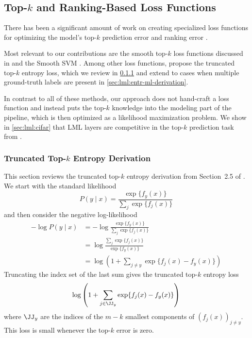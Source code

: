 \subsection{Top-$k$ and Ranking-Based Loss Functions}
\label{sec:lml:rw:topk}
There has been a significant amount of work on creating
specialized loss functions for optimizing the model's
top-$k$ prediction error
\cite{gupta2014training,li2014top,liu2015transductive,
  lapin2015top,liu2015transductive,lapin2016loss,berrada2018smooth}
and ranking error
\cite{agarwal2011infinite,rudin2009p,boyd2012accuracy,rakotomamonjy2012sparse}.

Most relevant to our contributions are the smooth
top-$k$ loss functions discussed in
\citet{lapin2016loss} and the Smooth SVM \cite{berrada2018smooth}.
Among other loss functions, \citet{lapin2016loss} propose the
truncated top-$k$ entropy loss,
which we review in \cref{sec:lml:entr-derivation} and
extend to cases when multiple ground-truth labels are
present in \cref{sec:lml:entr-ml-derivation}.

In contrast to all of these methods, our approach does
not hand-craft a loss function and instead puts
the top-$k$ knowledge into the modeling part of the
pipeline, which is then optimized as a likelihood
maximization problem.
We show in \cref{sec:lml:cifar} that LML layers are competitive
in the top-$k$ prediction task from \citet{berrada2018smooth}.

\subsubsection{Truncated Top-$k$ Entropy Derivation}
\label{sec:lml:entr-derivation}

This section reviews the truncated top-$k$ entropy derivation
from Section~2.5 of \citet{lapin2016loss}.
We start with the standard likelihood
\begin{equation}
  P(y\mid x)=\frac{\exp\{f_y(x)\}}{\sum_j \exp\{f_j(x)\}}
\end{equation}
and then consider the negative log-likelihood
\begin{equation}
  \begin{split}
    -\log P(y\mid x) &= -\log \frac{\exp\{f_y(x)\}}{\sum_j \exp\{f_j(x)\}} \\
    &= \log\frac{\sum_j \exp\{f_j(x)\}}{\exp\{f_y(x)\}} \\
    &= \log \left( 1 + \sum_{j\neq y} \exp\{f_j(x)-f_y(x)\} \right)
  \end{split}
\end{equation}
Truncating the index set of the last sum gives the truncated
top-$k$ entropy loss
\begin{equation}
  \log \left( 1 + \sum_{j\in \JJ_y} \exp\{f_j(x)-f_y(x)\} \right)
\end{equation}
where $\JJ_y$ are the indices of the $m-k$ smallest
components of $\left(f_j(x)\right)_{j\neq y}$.
This loss is small whenever the top-$k$ error is zero.

